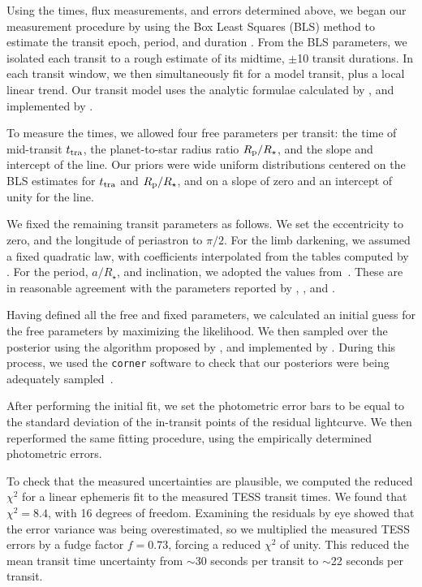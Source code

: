 \documentclass[12pt,twocolumn,tighten]{aastex62}
\begin{document}
Using the times, flux measurements, and errors determined above, we
began our measurement procedure by using the Box Least Squares (BLS)
method to estimate the transit epoch, period, and duration
\citep{kovacs_box-fitting_2002}.  From the BLS parameters, we isolated
each transit to a rough estimate of its midtime, $\pm$10 transit
durations.  In each transit window, we then simultaneously fit for a
model transit, plus a local linear trend.  Our transit model uses the
analytic formulae calculated by \citet{mandel_analytic_2002}, and
implemented by \citet{kreidberg_batman_2015}.

To measure the times, we allowed four free parameters per transit: the
time of mid-transit $t_{\rm tra}$, the planet-to-star radius ratio
$R_{\rm p}/R_\star$, and the slope and intercept of the line. Our
priors were wide uniform distributions centered on the BLS estimates
for $t_{\rm tra}$ and $R_{\rm p}/R_\star$, and on a slope of zero and
an intercept of unity for the line.

We fixed the remaining transit parameters as follows.  We set the
eccentricity to zero, and the longitude of periastron to $\pi/2$.  For
the limb darkening, we assumed a fixed quadratic law, with
coefficients interpolated from the tables computed by
\citet{claret_limb_2017}.  For the period, $a/R_\star$, and
inclination, we adopted the values from~\citet{petrucci_no_2013}.
These are in reasonable agreement with the parameters reported by
\citet{gillon_improved_2009}, \citet{southworth_high-precision_2009},
and \citet{huitson_gemini_2017}.

Having defined all the free and fixed parameters, we calculated an
initial guess for the free parameters by maximizing the likelihood.
We then sampled over the posterior using the algorithm proposed by
\citet{goodman_ensemble_2010}, and implemented by
\citet{foreman-mackey_emcee_2013}.  During this process, we used the
\texttt{corner} software to check that our posteriors were being
adequately sampled~\citep{corner_2016}.

After performing the initial fit, we set the photometric error bars to
be equal to the standard deviation of the in-transit points of the
residual lightcurve.  We then reperformed the same fitting procedure,
using the empirically determined photometric errors.

To check that the measured uncertainties are plausible, we computed
the reduced $\chi^2$ for a linear ephemeris fit to the measured TESS
transit times.  We found that $\chi^2 = 8.4$, with 16 degrees of
freedom.  Examining the residuals by eye showed that the error
variance was being overestimated, so we multiplied the measured TESS
errors by a fudge factor $f=0.73$, forcing a reduced $\chi^2$ of
unity.  This reduced the mean transit time uncertainty from $\sim$30
seconds per transit to $\sim$22 seconds per transit.
\end{document}
